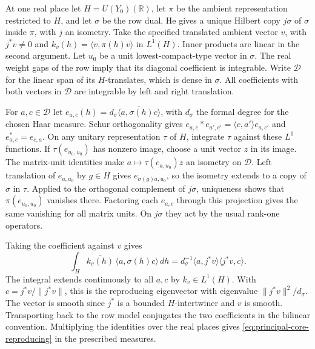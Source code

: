 At one real place let \(H=U(Y_0)(\mathbb R)\), let \(\pi\)
be the ambient representation restricted to \(H\), and let
\(\sigma\) be the row dual. He gives a unique Hilbert copy
\(j\sigma\) of \(\sigma\) inside \(\pi\), with \(j\) an
isometry. Take the specified translated ambient vector \(v\),
with \(j^*v\ne0\) and
\(k_v(h)=\langle v,\pi(h)v\rangle\) in \(L^1(H)\). Inner
products are linear in the second argument. Let \(u_0\)
be a unit lowest-compact-type vector in \(\sigma\).
The real weight gaps of the row imply that its diagonal
coefficient is integrable. Write \(\mathcal D\) for the
linear span of its \(H\)-translates, which is dense in
\(\sigma\). All coefficients with both vectors in
\(\mathcal D\) are integrable by left and right translation.

For \(a,c\in\mathcal D\) let
\(e_{a,c}(h)=d_\sigma\overline{\langle a,\sigma(h)c\rangle}\),
with \(d_\sigma\) the formal degree for the chosen Haar
measure. Schur orthogonality gives
\(e_{a,c}*e_{a',c'}=\langle c,a'\rangle e_{a,c'}\) and
\(e_{a,c}^*=e_{c,a}\). On any unitary representation
\(\tau\) of \(H\), integrate \(\tau\) against these \(L^1\)
functions. If \(\tau(e_{u_0,u_0})\) has nonzero image,
choose a unit vector \(z\) in its image. The matrix-unit
identities make \(a\mapsto \tau(e_{a,u_0})z\) an isometry
on \(\mathcal D\). Left translation of \(e_{a,u_0}\) by
\(g\in H\) gives \(e_{\sigma(g)a,u_0}\), so the isometry
extends to a copy of \(\sigma\) in \(\tau\). Applied to
the orthogonal complement of \(j\sigma\), uniqueness shows
that \(\pi(e_{u_0,u_0})\) vanishes there. Factoring each
\(e_{a,c}\) through this projection gives the same
vanishing for all matrix units. On \(j\sigma\) they act
by the usual rank-one operators.

Taking the coefficient against \(v\) gives
\[
 \int_H \overline{k_v(h)}\,\langle a,\sigma(h)c\rangle\,dh
     =d_\sigma^{-1}\langle a,j^*v\rangle\langle j^*v,c\rangle .
\]
The integral extends continuously to all \(a,c\) by
\(k_v\in L^1(H)\). With \(c=j^*v/\|j^*v\|\), this is
the reproducing eigenvector with eigenvalue
\(\|j^*v\|^2/d_\sigma\). The vector is smooth since \(j^*\)
is a bounded \(H\)-intertwiner and \(v\) is smooth. Transporting
back to the row model conjugates the two coefficients in
the bilinear convention. Multiplying the identities over
the real places gives \eqref{eq:principal-core-reproducing}
in the prescribed measures.

